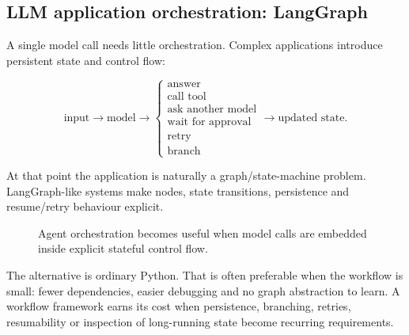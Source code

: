 \subsection{LLM application orchestration: LangGraph}

A single model call needs little orchestration.
Complex applications introduce persistent state and control flow:

\[
\text{input}
\rightarrow
\text{model}
\rightarrow
\begin{cases}
\text{answer}\\
\text{call tool}\\
\text{ask another model}\\
\text{wait for approval}\\
\text{retry}\\
\text{branch}
\end{cases}
\rightarrow
\text{updated state}.
\]

At that point the application is naturally a graph/state-machine problem.
LangGraph-like systems make nodes, state transitions, persistence and resume/retry behaviour explicit.

\begin{figure}[ht]
\centering
{}
\caption{Agent orchestration becomes useful when model calls are embedded inside explicit stateful control flow.}
\label{fig:langgraph}
\end{figure}

The alternative is ordinary Python.
That is often preferable when the workflow is small: fewer dependencies, easier debugging and no graph abstraction to learn.
A workflow framework earns its cost when persistence, branching, retries, resumability or inspection of long-running state become recurring requirements.

